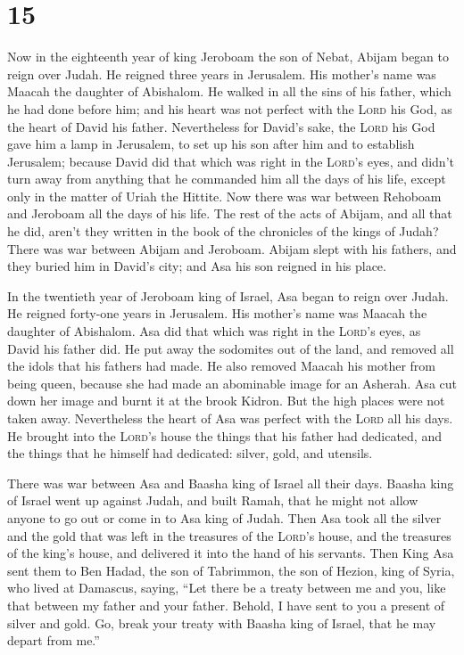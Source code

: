 \hypertarget{section-14}{%
\section{15}\label{section-14}}

 Now in the eighteenth year of king Jeroboam the son of
Nebat, Abijam began to reign over Judah.  He reigned three
years in Jerusalem. His mother's name was Maacah the daughter of
Abishalom.  He walked in all the sins of his father, which
he had done before him; and his heart was not perfect with the
\textsc{Lord} his God, as the heart of David his father. 
Nevertheless for David's sake, the \textsc{Lord} his God gave him a lamp
in Jerusalem, to set up his son after him and to establish Jerusalem;
 because David did that which was right in the
\textsc{Lord}'s eyes, and didn't turn away from anything that he
commanded him all the days of his life, except only in the matter of
Uriah the Hittite.  Now there was war between Rehoboam and
Jeroboam all the days of his life.  The rest of the acts
of Abijam, and all that he did, aren't they written in the book of the
chronicles of the kings of Judah? There was war between Abijam and
Jeroboam.  Abijam slept with his fathers, and they buried
him in David's city; and Asa his son reigned in his place.

 In the twentieth year of Jeroboam king of Israel, Asa
began to reign over Judah.  He reigned forty-one years in
Jerusalem. His mother's name was Maacah the daughter of Abishalom.
 Asa did that which was right in the \textsc{Lord}'s
eyes, as David his father did.  He put away the sodomites
out of the land, and removed all the idols that his fathers had made.
 He also removed Maacah his mother from being queen,
because she had made an abominable image for an Asherah. Asa cut down
her image and burnt it at the brook Kidron.  But the high
places were not taken away. Nevertheless the heart of Asa was perfect
with the \textsc{Lord} all his days.  He brought into the
\textsc{Lord}'s house the things that his father had dedicated, and the
things that he himself had dedicated: silver, gold, and utensils.

 There was war between Asa and Baasha king of Israel all
their days.  Baasha king of Israel went up against Judah,
and built Ramah, that he might not allow anyone to go out or come in to
Asa king of Judah.  Then Asa took all the silver and the
gold that was left in the treasures of the \textsc{Lord}'s house, and
the treasures of the king's house, and delivered it into the hand of his
servants. Then King Asa sent them to Ben Hadad, the son of Tabrimmon,
the son of Hezion, king of Syria, who lived at Damascus, saying,
 ``Let there be a treaty between me and you, like that
between my father and your father. Behold, I have sent to you a present
of silver and gold. Go, break your treaty with Baasha king of Israel,
that he may depart from me.''

